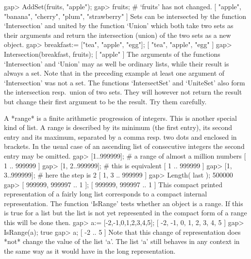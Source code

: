     gap> AddSet(fruits, "apple");
    gap> fruits;  #  `fruits' has not changed.
    [ "apple", "banana", "cherry", "plum", "strawberry" ] 
\endexample
Sets can be intersected by the function `Intersection'  and united by the
function `Union' which both take  two sets as their arguments  and return
the intersection (union) of the two sets as a new object.
\beginexample
    gap> breakfast:= ["tea", "apple", "egg"];
    [ "tea", "apple", "egg" ]
    gap> Intersection(breakfast, fruits);
    [ "apple" ] 
\endexample
The arguments of the functions `Intersection' and `Union'  may as well be
ordinary lists,  while  their result is  always  a set. Note that  in the
preceding example at least one argument of  `Intersection' was not a set.
The functions `IntersectSet'  and `UniteSet'  also form the  intersection
resp.~union  of  two sets. They  will  however not return  the result but
change their first argument to be the result. Try them carefully.


A *range* is a finite arithmetic progression of integers. This is another
special kind   of list. A range  is  described by its minimum  (the first
entry), its second entry and its maximum, separated  by a comma resp. two
dots and enclosed in brackets. In the usual case  of an ascending list of
consecutive integers the second entry may be omitted.
\beginexample
    gap> [1..999999];     #  a range of almost a million numbers
    [ 1 .. 999999 ]
    gap> [1, 2..999999];  #  this is equivalent
    [ 1 .. 999999 ]
    gap> [1, 3..999999];  #  here the step is 2
    [ 1, 3 .. 999999 ]
    gap> Length( last );
    500000
    gap> [ 999999, 999997 .. 1 ];
    [ 999999, 999997 .. 1 ]
\endexample
This compact printed representation of a fairly long  list corresponds to
a  compact internal representation.  The function `IsRange' tests whether
an object is a range.  If this is true for a list but the list is not yet
represented in the compact form of a range this will be done then.
\beginexample
    gap> a:= [-2,-1,0,1,2,3,4,5];
    [ -2, -1, 0, 1, 2, 3, 4, 5 ]
    gap> IsRange(a);
    true
    gap> a;
    [ -2 .. 5 ]
\endexample
Note that this  change of representation does  *not* change the  value of
the list `a'. The list `a'  still behaves in any context  in the same way
as it would have in the long representation.

\null

